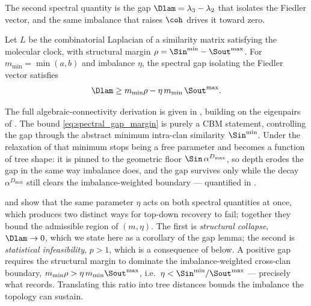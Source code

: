 
The second spectral quantity is the gap $\Dlam=\lambda_3-\lambda_2$ that isolates
the Fiedler vector, and the same imbalance that raises $\coh$ drives it toward
zero.

\begin{lemma}\label{lem:gap}
Let $L$ be the combinatorial Laplacian of a similarity matrix satisfying the
molecular clock, with structural margin $\rho=\Sin^{\min}-\Sout^{\max}$. For
$m_{\min}=\min(a,b)$ and imbalance $\eta$, the spectral gap isolating the Fiedler
vector satisfies
\begin{equation}\label{eq:spectral_gap_margin}
   \Dlam \ge m_{\min}\rho-\eta\,m_{\min}\,\Sout^{\max}.
\end{equation}
\end{lemma}
\noindent The full algebraic-connectivity derivation is given in ,
building on the eigenpairs of . The bound
\eqref{eq:spectral_gap_margin} is purely a CBM statement, controlling the gap
through the abstract minimum intra-clan similarity $\Sin^{\min}$. Under the
relaxation of  that minimum stops being a free parameter and becomes
a function of tree shape: it is pinned to the geometric floor
$\Sin\,\alpha^{D_{\max}}$, so depth erodes the gap in the same way imbalance does,
and the gap survives only while the decay $\alpha^{D_{\max}}$ still clears the
imbalance-weighted boundary --- quantified in .

 and  show that the same parameter $\eta$ acts
on both spectral quantities at once, which produces two distinct ways for
top-down recovery to fail; together they bound the admissible region of
$(m,\eta)$. The first is \emph{structural collapse},
$\Dlam\to0$, which we state here as a corollary of the gap lemma; the second is
\emph{statistical infeasibility}, $p>1$, which is a consequence of
 below. A positive gap requires the structural margin to
dominate the imbalance-weighted cross-clan boundary,
$m_{\min}\rho>\eta\,m_{\min}\Sout^{\max}$, i.e.\
$\eta<\Sin^{\min}/\Sout^{\max}$ --- precisely what  records.
Translating this
ratio into tree distances bounds the imbalance the topology can sustain.

